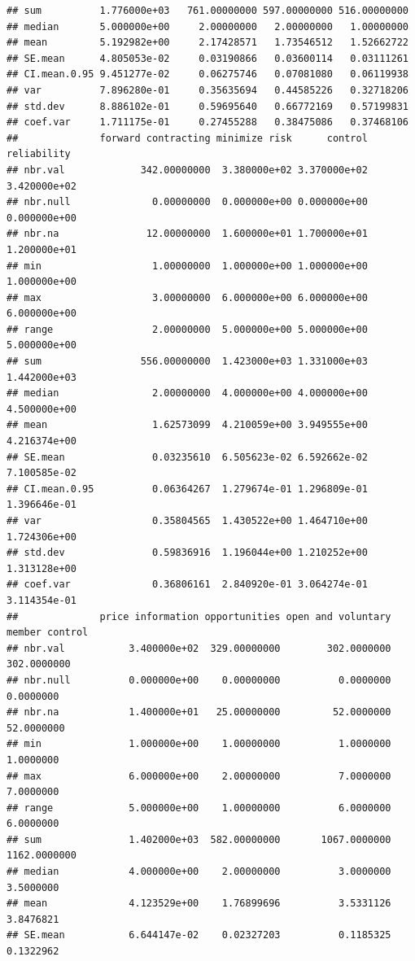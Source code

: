 \documentclass[
]{article}
\begin{document}
\begin{verbatim}
## sum          1.776000e+03   761.00000000 597.00000000 516.00000000
## median       5.000000e+00     2.00000000   2.00000000   1.00000000
## mean         5.192982e+00     2.17428571   1.73546512   1.52662722
## SE.mean      4.805053e-02     0.03190866   0.03600114   0.03111261
## CI.mean.0.95 9.451277e-02     0.06275746   0.07081080   0.06119938
## var          7.896280e-01     0.35635694   0.44585226   0.32718206
## std.dev      8.886102e-01     0.59695640   0.66772169   0.57199831
## coef.var     1.711175e-01     0.27455288   0.38475086   0.37468106
##              forward contracting minimize risk      control  reliability
## nbr.val             342.00000000  3.380000e+02 3.370000e+02 3.420000e+02
## nbr.null              0.00000000  0.000000e+00 0.000000e+00 0.000000e+00
## nbr.na               12.00000000  1.600000e+01 1.700000e+01 1.200000e+01
## min                   1.00000000  1.000000e+00 1.000000e+00 1.000000e+00
## max                   3.00000000  6.000000e+00 6.000000e+00 6.000000e+00
## range                 2.00000000  5.000000e+00 5.000000e+00 5.000000e+00
## sum                 556.00000000  1.423000e+03 1.331000e+03 1.442000e+03
## median                2.00000000  4.000000e+00 4.000000e+00 4.500000e+00
## mean                  1.62573099  4.210059e+00 3.949555e+00 4.216374e+00
## SE.mean               0.03235610  6.505623e-02 6.592662e-02 7.100585e-02
## CI.mean.0.95          0.06364267  1.279674e-01 1.296809e-01 1.396646e-01
## var                   0.35804565  1.430522e+00 1.464710e+00 1.724306e+00
## std.dev               0.59836916  1.196044e+00 1.210252e+00 1.313128e+00
## coef.var              0.36806161  2.840920e-01 3.064274e-01 3.114354e-01
##              price information opportunities open and voluntary member control
## nbr.val           3.400000e+02  329.00000000        302.0000000    302.0000000
## nbr.null          0.000000e+00    0.00000000          0.0000000      0.0000000
## nbr.na            1.400000e+01   25.00000000         52.0000000     52.0000000
## min               1.000000e+00    1.00000000          1.0000000      1.0000000
## max               6.000000e+00    2.00000000          7.0000000      7.0000000
## range             5.000000e+00    1.00000000          6.0000000      6.0000000
## sum               1.402000e+03  582.00000000       1067.0000000   1162.0000000
## median            4.000000e+00    2.00000000          3.0000000      3.5000000
## mean              4.123529e+00    1.76899696          3.5331126      3.8476821
## SE.mean           6.644147e-02    0.02327203          0.1185325      0.1322962

\end{verbatim}
\end{document}
